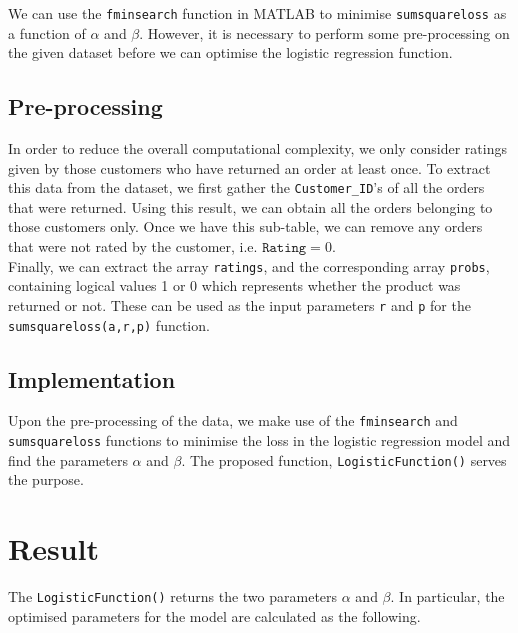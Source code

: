 \documentclass[11pt]{report}
\begin{document}
We can use the \texttt{fminsearch} function in MATLAB to minimise \texttt{sumsquareloss} as a function of $\alpha$ and $\beta$. However, it is necessary to perform some pre-processing on the given dataset before we can optimise the logistic regression function.

\subsection{Pre-processing}
In order to reduce the overall computational complexity, we only consider ratings given by those customers who have returned an order at least once. To extract this data from the dataset, we first gather the \texttt{Customer\_ID}'s of all the orders that were returned. Using this result, we can obtain all the orders belonging to those customers only. Once we have this sub-table, we can remove any orders that were not rated by the customer, i.e. $\texttt{Rating}=0$. \\

Finally, we can extract the array \texttt{ratings}, and the corresponding array \texttt{probs}, containing logical values 1 or 0 which represents whether the product was returned or not. These can be used as the input parameters \texttt{r} and \texttt{p} for the \texttt{sumsquareloss(a,r,p)} function.

\subsection{Implementation}
Upon the pre-processing of the data, we make use of the \texttt{fminsearch} and \texttt{sumsquareloss} functions to minimise the loss in the logistic regression model and find the parameters $\alpha$ and $\beta$. The proposed function, \texttt{LogisticFunction()} serves the purpose. \\




\section{Result}
The \texttt{LogisticFunction()} returns the two parameters $\alpha$ and $\beta$. In particular, the optimised parameters for the model are calculated as the following. \\
\end{document}
